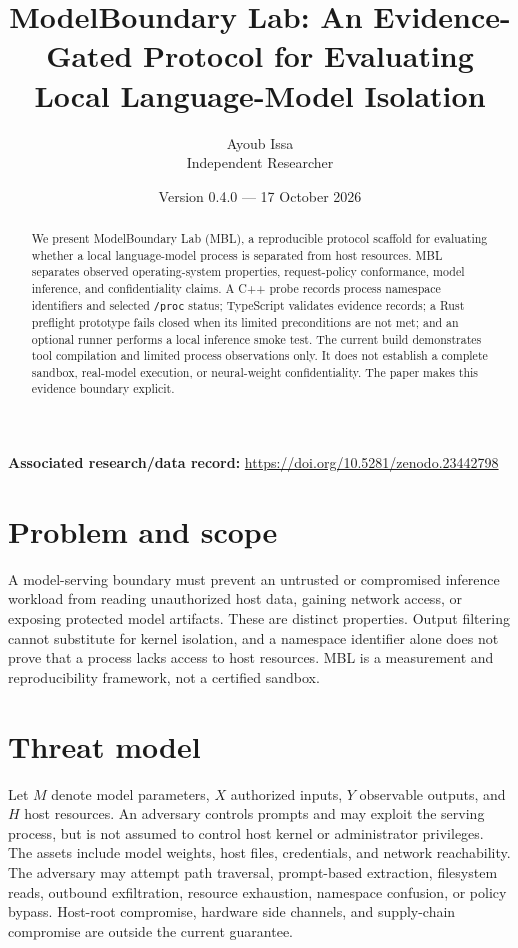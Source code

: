 \documentclass[10pt]{article}
\title{ModelBoundary Lab: An Evidence-Gated Protocol for Evaluating Local Language-Model Isolation}
\author{Ayoub Issa \\ Independent Researcher}
\date{Version 0.4.0 --- 17 October 2026}
\begin{document}
\noindent\textbf{Associated research/data record:} \url{https://doi.org/10.5281/zenodo.23442798}\par
\maketitle
\begin{abstract}
We present ModelBoundary Lab (MBL), a reproducible protocol scaffold for evaluating whether a local language-model process is separated from host resources. MBL separates observed operating-system properties, request-policy conformance, model inference, and confidentiality claims. A C++ probe records process namespace identifiers and selected \texttt{/proc} status; TypeScript validates evidence records; a Rust preflight prototype fails closed when its limited preconditions are not met; and an optional runner performs a local inference smoke test. The current build demonstrates tool compilation and limited process observations only. It does not establish a complete sandbox, real-model execution, or neural-weight confidentiality. The paper makes this evidence boundary explicit.
\end{abstract}
\section{Problem and scope}
A model-serving boundary must prevent an untrusted or compromised inference workload from reading unauthorized host data, gaining network access, or exposing protected model artifacts. These are distinct properties. Output filtering cannot substitute for kernel isolation, and a namespace identifier alone does not prove that a process lacks access to host resources. MBL is a measurement and reproducibility framework, not a certified sandbox.
\section{Threat model}
Let $M$ denote model parameters, $X$ authorized inputs, $Y$ observable outputs, and $H$ host resources. An adversary controls prompts and may exploit the serving process, but is not assumed to control host kernel or administrator privileges. The assets include model weights, host files, credentials, and network reachability. The adversary may attempt path traversal, prompt-based extraction, filesystem reads, outbound exfiltration, resource exhaustion, namespace confusion, or policy bypass. Host-root compromise, hardware side channels, and supply-chain compromise are outside the current guarantee.
\end{document}
